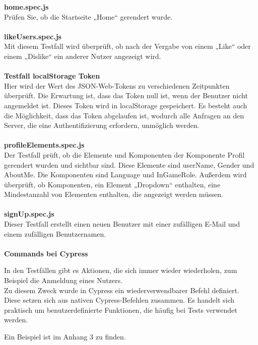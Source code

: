\newpage
\textbf{home.spec.js}\\
Prüfen Sie, ob die Startseite „Home“ gerendert wurde.
\\\\
\textbf{likeUsers.spec.js}\\
Mit diesem Testfall wird überprüft, ob nach der Vergabe von einem „Like“ oder einem „Dislike“ ein anderer Nutzer angezeigt wird.
\\\\
\textbf{Testfall localStorage Token}\\
Hier wird der Wert des JSON-Web-Tokens zu verschiedenen Zeitpunkten überprüft.
Die Erwartung ist, dass das Token null ist, wenn der Benutzer nicht angemeldet ist.
Dieses Token wird in localStorage gespeichert.
Es besteht auch die Möglichkeit, dass das Token abgelaufen ist, wodurch alle Anfragen an den Server, die eine Authentifizierung erfordern, unmöglich werden.
\\\\
\textbf{profileElements.spec.js}\\
Der Testfall prüft, ob die Elemente und Komponenten der Komponente Profil gerendert wurden und sichtbar sind. Diese Elemente sind userName, Gender und AboutMe. Die Komponenten sind Language und InGameRole.
Außerdem wird überprüft, ob Komponenten, ein Element „Dropdown“ enthalten, eine Mindestanzahl von Elementen enthalten, die angezeigt werden müssen. 
\\\\
\textbf{signUp.spec.js}\\
Dieser Testfall erstellt einen neuen Benutzer mit einer zufälligen E-Mail und einem zufälligen Benutzernamen.  \\
\\
\textbf{Commands bei Cypress}\\
\begin{flushleft}
In den Testfällen gibt es Aktionen, die sich immer wieder wiederholen, zum Beispiel die Anmeldung eines Nutzers.
\\
Zu diesem Zweck wurde in Cypress ein wiederverwendbarer Befehl definiert.
\\
Diese setzen sich aus nativen Cypress-Befehlen zusammen. Es handelt sich praktisch um benutzerdefinierte Funktionen, die häufig bei Tests verwendet werden.

Ein Beispiel ist im Anhang 3 zu finden.
\end{flushleft}

